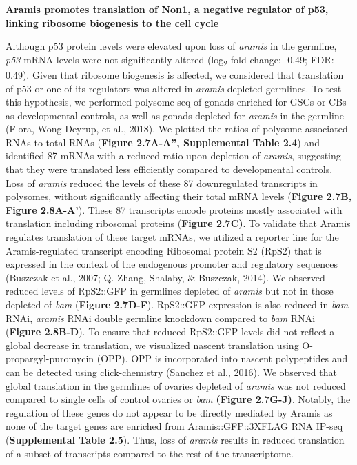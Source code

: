 \documentclass[12pt,oneside]{reedthesis}
\begin{document}
\textbf{Aramis promotes translation of Non1, a negative regulator of p53,
linking ribosome biogenesis to the cell cycle}

Although p53 protein levels were elevated upon loss of \emph{aramis} in the
germline, \emph{p53} mRNA levels were not significantly altered (log\textsubscript{2} fold
change: -0.49; FDR: 0.49). Given that ribosome biogenesis is affected,
we considered that translation of p53 or one of its regulators was
altered in \emph{aramis}-depleted germlines. To test this hypothesis, we
performed polysome-seq of gonads enriched for GSCs or CBs as
developmental controls, as well as gonads depleted for \emph{aramis} in the
germline (Flora, Wong-Deyrup, et al., 2018). We plotted the ratios of polysome-associated
RNAs to total RNAs (\textbf{Figure 2.7A-A'', Supplemental Table 2.4}) and
identified 87 mRNAs with a reduced ratio upon depletion of \emph{aramis},
suggesting that they were translated less efficiently compared to
developmental controls. Loss of \emph{aramis} reduced the levels of these 87
downregulated transcripts in polysomes, without significantly affecting
their total mRNA levels (\textbf{Figure 2.7B, Figure 2.8A-A'}). These 87
transcripts encode proteins mostly associated with translation including
ribosomal proteins (\textbf{Figure 2.7C)}. To validate that Aramis regulates
translation of these target mRNAs, we utilized a reporter line for the
Aramis-regulated transcript encoding Ribosomal protein S2 (RpS2) that is
expressed in the context of the endogenous promoter and regulatory
sequences (Buszczak et al., 2007; Q. Zhang, Shalaby, \& Buszczak, 2014). We
observed reduced levels of RpS2::GFP in germlines depleted of \emph{aramis}
but not in those depleted of \emph{bam} (\textbf{Figure 2.7D-F}). RpS2::GFP
expression is also reduced in \emph{bam} RNAi, \emph{aramis} RNAi double germline
knockdown compared to \emph{bam} RNAi (\textbf{Figure 2.8B-D}). To ensure that
reduced RpS2::GFP levels did not reflect a global decrease in
translation, we visualized nascent translation using
O-propargyl-puromycin (OPP). OPP is incorporated into nascent
polypeptides and can be detected using click-chemistry
(Sanchez et al., 2016). We observed that global translation in the germlines
of ovaries depleted of \emph{aramis} was not reduced compared to single cells
of control ovaries or \emph{bam} \textbf{(Figure 2.7G-J)}. Notably, the regulation
of these genes do not appear to be directly mediated by Aramis as none
of the target genes are enriched from Aramis::GFP::3XFLAG RNA IP-seq
(\textbf{Supplemental Table 2.5}). Thus, loss of \emph{aramis} results in reduced
translation of a subset of transcripts compared to the rest of the
transcriptome.
\end{document}

